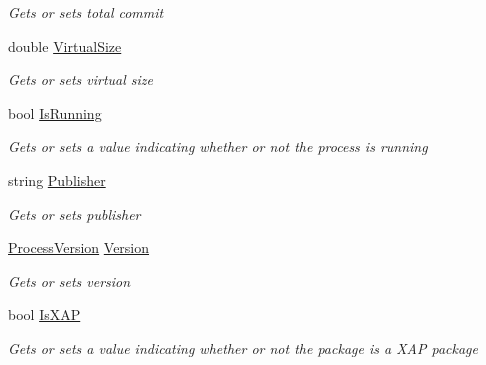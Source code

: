 \begin{DoxyCompactItemize}
\begin{DoxyCompactList}\small\item\em Gets or sets total commit \end{DoxyCompactList}\item 
double \hyperlink{class_microsoft_1_1_tools_1_1_windows_device_portal_1_1_device_portal_1_1_device_process_info_a4d4052708d85ad61b7c966666552afbc}{Virtual\+Size}
\begin{DoxyCompactList}\small\item\em Gets or sets virtual size \end{DoxyCompactList}\item 
bool \hyperlink{class_microsoft_1_1_tools_1_1_windows_device_portal_1_1_device_portal_1_1_device_process_info_a6a5ddefba6ce8459d9d11b6059bd1063}{Is\+Running}
\begin{DoxyCompactList}\small\item\em Gets or sets a value indicating whether or not the process is running \end{DoxyCompactList}\item 
string \hyperlink{class_microsoft_1_1_tools_1_1_windows_device_portal_1_1_device_portal_1_1_device_process_info_a4f2d245cead27eea355152158da5343e}{Publisher}
\begin{DoxyCompactList}\small\item\em Gets or sets publisher \end{DoxyCompactList}\item 
\hyperlink{class_microsoft_1_1_tools_1_1_windows_device_portal_1_1_device_portal_1_1_process_version}{Process\+Version} \hyperlink{class_microsoft_1_1_tools_1_1_windows_device_portal_1_1_device_portal_1_1_device_process_info_a95cf0d76267dd5ee099fd4ff4662c74a}{Version}
\begin{DoxyCompactList}\small\item\em Gets or sets version \end{DoxyCompactList}\item 
bool \hyperlink{class_microsoft_1_1_tools_1_1_windows_device_portal_1_1_device_portal_1_1_device_process_info_abddd15c8e8c94db574d1829d8ef26ba2}{Is\+X\+AP}
\begin{DoxyCompactList}\small\item\em Gets or sets a value indicating whether or not the package is a X\+AP package \end{DoxyCompactList}\end{DoxyCompactItemize}



